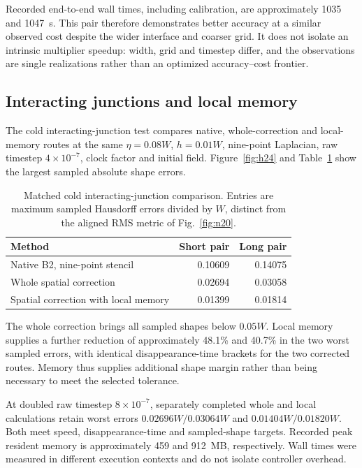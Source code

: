 Recorded end-to-end wall times, including calibration, are approximately 1035 and 1047~s. This pair therefore demonstrates better accuracy at a similar observed cost despite the wider interface and coarser grid. It does not isolate an intrinsic multiplier speedup: width, grid and timestep differ, and the observations are single realizations rather than an optimized accuracy--cost frontier.

\subsection{Interacting junctions and local memory}
\label{sec:interactions}
The cold interacting-junction test compares native, whole-correction and local-memory routes at the same $\eta=0.08W$, $h=0.01W$, nine-point Laplacian, raw timestep $4\times10^{-7}$, clock factor and initial field. Figure~\ref{fig:h24} and Table~\ref{tab:h24} show the largest sampled absolute shape errors.

\begin{table}[pos=htbp,abovecap=10pt]
\caption{Matched cold interacting-junction comparison. Entries are maximum sampled Hausdorff errors divided by $W$, distinct from the aligned RMS metric of Fig.~\ref{fig:n20}.}
\label{tab:h24}
\centering
\begin{tabular}{lrr}
\toprule
Method & Short pair & Long pair\\
\midrule
Native B2, nine-point stencil & 0.10609 & 0.14075\\
Whole spatial correction & 0.02694 & 0.03058\\
Spatial correction with local memory & 0.01399 & 0.01814\\
\bottomrule
\end{tabular}
\end{table}

The whole correction brings all sampled shapes below $0.05W$. Local memory supplies a further reduction of approximately 48.1\% and 40.7\% in the two worst sampled errors, with identical disappearance-time brackets for the two corrected routes. Memory thus supplies additional shape margin rather than being necessary to meet the selected tolerance.

At doubled raw timestep $8\times10^{-7}$, separately completed whole and local calculations retain worst errors $0.02696W/0.03064W$ and $0.01404W/0.01820W$. Both meet speed, disappearance-time and sampled-shape targets. Recorded peak resident memory is approximately 459 and 912~MB, respectively. Wall times were measured in different execution contexts and do not isolate controller overhead.

